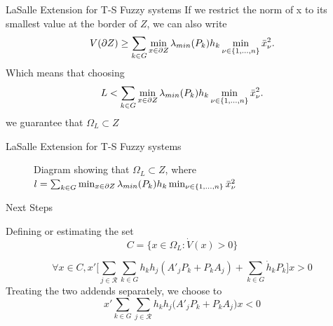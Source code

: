 \begin{frame}{LaSalle Extension for T-S Fuzzy systems}
If we restrict the norm of x to its smallest value at the border of $Z$, we can also write 
\begin{equation}
    V(\partial Z) \geq \sum_{k \in G}\min_{x \in \partial Z}\lambda_{min}(P_k)h_k\min_{\nu \in \{1,...,n\}}{\Bar{x}^2_{\nu}}. 
\end{equation}
Which means that choosing 
\begin{equation}
    L < \sum_{k \in G}\min_{x \in \partial Z}\lambda_{min}(P_k)h_k\min_{\nu \in \{1,...,n\}}{\Bar{x}^2_{\nu}}. 
\end{equation}
we guarantee that $\Omega_L \subset Z$
\end{frame}
\begin{frame}{LaSalle Extension for T-S Fuzzy systems}
    \begin{figure}[!h]
    \centering
    \caption{Diagram showing that $\Omega_L \subset Z$, where $l = \sum_{k \in G}\min_{x \in \partial Z}\lambda_{min}(P_k)h_k\min_{\nu \in \{1,...,n\}}{\Bar{x}^2_{\nu}}$}
    \label{fig:set_omega_L}
\end{figure}
\end{frame}

\begin{frame}{Next Steps}
\begin{block}{}
Defining or estimating the set
    \begin{equation}
        C = \{x \in \Omega_L : \dot{V}(x) > 0\}
    \end{equation}
\end{block}
\begin{equation*}
        \forall x \in C, 
    x'\big[\sum_{j \in \mathcal{R}}\sum_{k \in G}h_kh_j(A'_jP_k + P_kA_j)+ \sum_{k \in G}\dot{h}_kP_k\big]x > 0
    \end{equation*}
Treating the two addends separately, we choose to
\begin{equation*}
x'\sum_{k \in G}\sum_{j \in \mathcal{R}}h_kh_j\big(A'_jP_k+P_kA_j\big)x < 0    
\end{equation*}
\end{frame}

